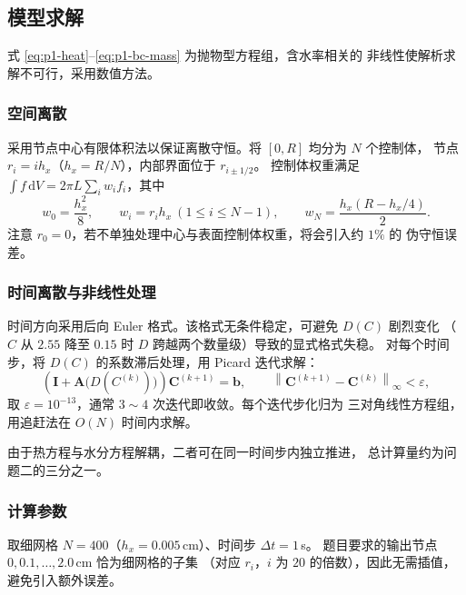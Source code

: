 \documentclass[12pt,a4paper]{ctexart}
\begin{document}
\subsection{模型求解}
\label{sec:p1-solve}

式 \eqref{eq:p1-heat}--\eqref{eq:p1-bc-mass} 为抛物型方程组，含水率相关的
非线性使解析求解不可行，采用数值方法。

\subsubsection{空间离散}

采用节点中心有限体积法以保证离散守恒。将 $[0,R]$ 均分为 $N$ 个控制体，
节点 $r_i=ih_x$（$h_x=R/N$），内部界面位于 $r_{i\pm1/2}$。
控制体权重满足 $\int f\,\mathrm{d}V=2\pi L\sum_i w_i f_i$，其中
\begin{equation}
  w_0=\frac{h_x^2}{8},\qquad
  w_i=r_i h_x\ (1\le i\le N-1),\qquad
  w_N=\frac{h_x(R-h_x/4)}{2}.
  \label{eq:p1-weights}
\end{equation}
注意 $r_0=0$，若不单独处理中心与表面控制体权重，将会引入约 $1\%$ 的
伪守恒误差。

\subsubsection{时间离散与非线性处理}

时间方向采用后向 Euler 格式。该格式无条件稳定，可避免 $D(C)$ 剧烈变化
（$C$ 从 $2.55$ 降至 $0.15$ 时 $D$ 跨越两个数量级）导致的显式格式失稳。
对每个时间步，将 $D(C)$ 的系数滞后处理，用 Picard 迭代求解：
\begin{equation}
  \left(\bm{I}+\bm{A}\big(D(C^{(k)})\big)\right)\bm{C}^{(k+1)}=\bm{b},
  \qquad
  \left\|\bm{C}^{(k+1)}-\bm{C}^{(k)}\right\|_\infty<\varepsilon,
  \label{eq:p1-picard}
\end{equation}
取 $\varepsilon=10^{-13}$，通常 $3\sim4$ 次迭代即收敛。每个迭代步化归为
三对角线性方程组，用追赶法在 $O(N)$ 时间内求解。

由于热方程与水分方程解耦，二者可在同一时间步内独立推进，
总计算量约为问题二的三分之一。

\subsubsection{计算参数}

取细网格 $N=400$（$h_x=0.005$\,cm）、时间步 $\Delta t=1$\,s。
题目要求的输出节点 $0,0.1,\dots,2.0$\,cm 恰为细网格的子集
（对应 $r_i$，$i$ 为 $20$ 的倍数），因此无需插值，避免引入额外误差。
\end{document}
